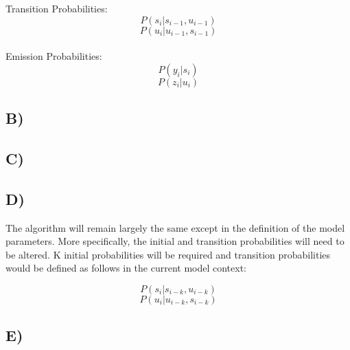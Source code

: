 \documentclass{report}
\begin{document}
Transition Probabilities:
\begin{equation}
  P(s_i | s_{i-1}, u_{i-1})
\end{equation}
\begin{equation}
  P(u_i | u_{i-1}, s_{i-1})
\end{equation}\\

Emission Probabilities:
\begin{equation}
  P(y_i | s_i)
\end{equation}
\begin{equation}
  P(z_i | u_i)
\end{equation}

\subsection*{B)}

\subsection*{C)}

\subsection*{D)}
The algorithm will remain largely the same except in the definition of the model
parameters. More specifically, the initial and transition probabilities will need
to be altered. K initial probabilities will be required and transition probabilities
would be defined as follows in the current model context:

\begin{equation}
  P(s_i | s_{i-k}, u_{i-k})
\end{equation}
\begin{equation}
  P(u_i | u_{i-k}, s_{i-k})
\end{equation}
\subsection*{E)}
\end{document}
